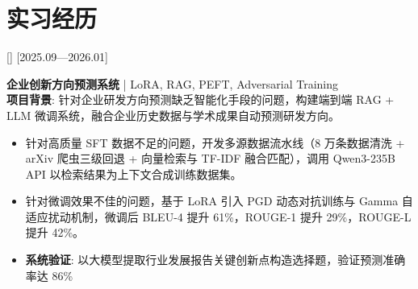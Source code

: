 \documentclass{resume-photo}
\begin{document}
\section{实习经历}

[]
[2025.09—2026.01]

\vspace{0.3em}
\noindent \textbf{企业创新方向预测系统} | LoRA, RAG, PEFT, Adversarial Training
\vspace{0.3em}
\\
\noindent \textbf{项目背景}: 针对企业研发方向预测缺乏智能化手段的问题，构建端到端 RAG + LLM 微调系统，融合企业历史数据与学术成果自动预测研发方向。
\begin{itemize}
  \item 针对高质量 SFT 数据不足的问题，开发多源数据流水线（8 万条数据清洗 + arXiv 爬虫三级回退 + 向量检索与 TF-IDF 融合匹配），调用 Qwen3-235B API 以检索结果为上下文合成训练数据集。
  \item 针对微调效果不佳的问题，基于 LoRA 引入 PGD 动态对抗训练与 Gamma 自适应扰动机制，微调后 BLEU-4 提升 61\%，ROUGE-1 提升 29\%，ROUGE-L 提升 42\%。
  \item \textbf{系统验证}: 以大模型提取行业发展报告关键创新点构造选择题，验证预测准确率达 86\%
\end{itemize}


\end{document}
